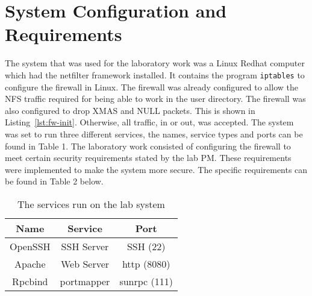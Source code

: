 \section{System Configuration and Requirements}
\label{sec:setup}
The system that was used for the laboratory work was a Linux Redhat computer which had the netfilter framework installed. It contains the program \verb;iptables; to configure the firewall in Linux. The firewall was already configured to allow the NFS traffic required for being able to work in the user directory. The firewall was also configured to drop XMAS and NULL packets. This is shown in Listing~\ref{lst:fw-init}. Otherwise, all traffic, in or out, was accepted. The system was set to run three different services, the names, service types and ports can be found in Table 1. The laboratory work consisted of configuring the firewall to meet certain security requirements stated by the lab PM. These requirements were implemented to make the system more secure. The specific requirements can be found in Table 2 below.


\begin{table}[htp]
\centering
	\begin{tabular}{| c | c | c |}
	\hline
	 Name & Service & Port \\ \hline
	 OpenSSH & SSH Server & SSH (22) \\
	 Apache & Web Server & http (8080) \\
	 Rpcbind & portmapper & sunrpc (111) \\ 
	\hline
	\end{tabular}
	\caption{The services run on the lab system}
	\label{Service table}
\end{table}


